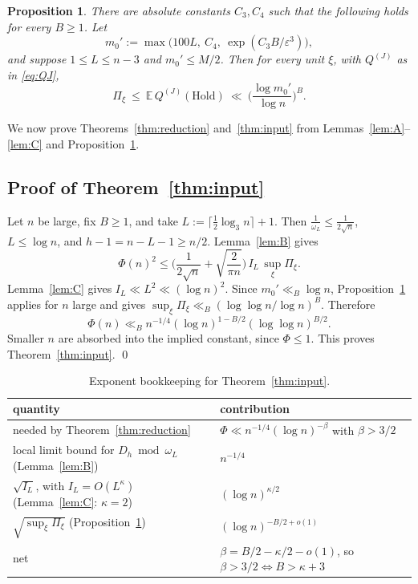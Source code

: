 \documentclass[11pt]{amsart}
\newtheorem{propL}[lemmaL]{Proposition} %
\theoremstyle{remark}
\newcommand{\E}{\mathbb{E}}
\newcommand{\Hold}{\mathrm{Hold}}
\theoremstyle{plain}
\begin{document}
\begin{propL}\label{prop:D}
There are absolute constants $C_3,C_4$ such that the following holds for every $B\ge1$. Let
\[
m_0':=\max\big(100L,\ C_4,\ \exp(C_3B/\varepsilon^3)\big),
\]
and suppose $1\le L\le n-3$ and $m_0'\le M/2$. Then for every unit $\xi$, with $Q^{(J)}$ as in \eqref{eq:QJ},
\[
\Pi_\xi\ \le\ \E\,Q^{(J)}(\Hold)\ \ll\ \Big(\frac{\log m_0'}{\log n}\Big)^{B}.
\]
\end{propL}

We now prove Theorems~\ref{thm:reduction} and~\ref{thm:input} from Lemmas~\ref{lem:A}--\ref{lem:C} and Proposition~\ref{prop:D}.

\subsection{Proof of Theorem~\ref{thm:input}}

Let $n$ be large, fix $B\ge1$, and take $L:=\lceil\tfrac12\log_3n\rceil+1$. Then $\frac1{\omega_L}\le\frac1{2\sqrt n}$, $L\le\log n$, and $h-1=n-L-1\ge n/2$. Lemma~\ref{lem:B} gives
\[
\Phi(n)^2\le\Big(\frac1{2\sqrt n}+\sqrt{\frac{2}{\pi n}}\Big)\,I_L\,\sup_\xi\Pi_\xi .
\]
Lemma~\ref{lem:C} gives $I_L\ll L^2\ll(\log n)^2$. Since $m_0'\ll_B\log n$, Proposition~\ref{prop:D} applies for $n$ large and gives $\sup_\xi\Pi_\xi\ll_B(\log\log n/\log n)^B$. Therefore
\[
\Phi(n)\ll_B n^{-1/4}(\log n)^{1-B/2}(\log\log n)^{B/2}.
\]
Smaller $n$ are absorbed into the implied constant, since $\Phi\le1$. This proves Theorem~\ref{thm:input}. \qed

\begin{table}[h]
\centering
\small
\begin{tabular}{@{}ll@{}}
\toprule
quantity & contribution \\
\midrule
needed by Theorem~\ref{thm:reduction} & $\Phi\ll n^{-1/4}(\log n)^{-\beta}$ with $\beta>3/2$ \\
local limit bound for $D_h\bmod\omega_L$ (Lemma~\ref{lem:B}) & $n^{-1/4}$ \\
$\sqrt{I_L}$, with $I_L=O(L^\kappa)$ (Lemma~\ref{lem:C}: $\kappa=2$) & $(\log n)^{\kappa/2}$ \\
$\sqrt{\sup_\xi\Pi_\xi}$ (Proposition~\ref{prop:D}) & $(\log n)^{-B/2+o(1)}$ \\
net & $\beta=B/2-\kappa/2-o(1)$, so $\beta>3/2\iff B>\kappa+3$ \\
\bottomrule
\end{tabular}
\caption{Exponent bookkeeping for Theorem~\ref{thm:input}.}\label{tab:exponents}
\end{table}
\end{document}
